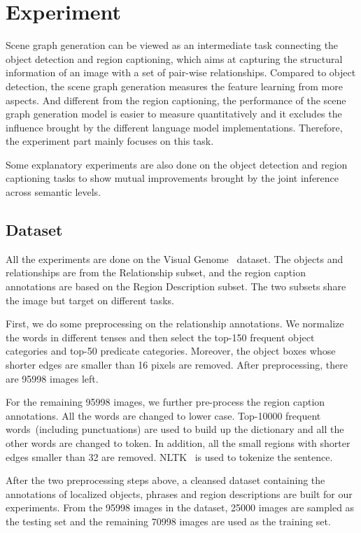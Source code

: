 


\section{Experiment}
Scene graph generation can be viewed as an intermediate task connecting the object detection and region captioning, which aims at capturing the structural information of an image with a set of pair-wise relationships. Compared to object detection, the scene graph generation measures the feature learning from more aspects. And different from the region captioning, the performance of the scene graph generation model is easier to measure quantitatively and it excludes the influence brought by the different language model implementations. Therefore, the experiment part mainly focuses on this task.

Some explanatory experiments are also done on the object detection and region captioning tasks to show mutual improvements brought by the joint inference across semantic levels.

\subsection{Dataset}
\label{sec:dataset}
All the experiments are done on the Visual Genome~\cite{visual_genome} dataset. The objects and relationships are from the Relationship subset, and the region caption annotations are based on the Region Description subset. The two subsets share the image but target on different tasks.

First, we do some preprocessing on the relationship annotations. We normalize the words in different tenses and then select the top-150 frequent object categories and top-50 predicate categories. Moreover, the object boxes whose shorter edges are smaller than 16 pixels are removed. After preprocessing, there are 95998 images left.

For the remaining 95998 images, we further pre-process the region caption annotations. All the words are changed to lower case. Top-10000 frequent words~(including punctuations) are used to build up the dictionary and all the other words are changed to  token. In addition, all the small regions with shorter edges smaller than 32 are removed. NLTK~\cite{nltk} is used to tokenize the sentence. 

After the two preprocessing steps above, a cleansed dataset containing the annotations of localized objects, phrases and region descriptions are built for our experiments. From the 95998 images in the dataset, 25000 images are sampled as the testing set and the remaining 70998 images are used as the training set. 


